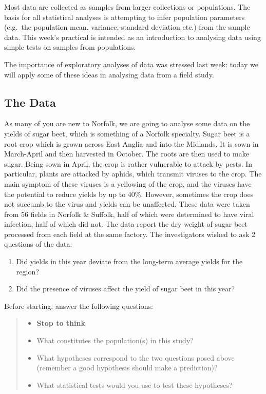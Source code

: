 \documentclass[
]{book}
\providecommand{\tightlist}{%
  \setlength{\itemsep}{0pt}\setlength{\parskip}{0pt}}
\begin{document}
Most data are collected as samples from larger collections or populations. The basis for all statistical analyses is attempting to infer population parameters (e.g.~the population mean, variance, standard deviation etc.) from the sample data. This week's practical is intended as an introduction to analysing data using simple tests on samples from populations.

The importance of exploratory analyses of data was stressed last week: today we will apply some of these ideas in analysing data from a field study.

\subsection{The Data}\label{the-data}

As many of you are new to Norfolk, we are going to analyse some data on the yields of sugar beet, which is something of a Norfolk specialty. Sugar beet is a root crop which is grown across East Anglia and into the Midlands. It is sown in March-April and then harvested in October. The roots are then used to make sugar. Being sown in April, the crop is rather vulnerable to attack by pests. In particular, plants are attacked by aphids, which transmit viruses to the crop. The main symptom of these viruses is a yellowing of the crop, and the viruses have the potential to reduce yields by up to 40\%. However, sometimes the crop does not succumb to the virus and yields can be unaffected.
These data were taken from 56 fields in Norfolk \& Suffolk, half of which were determined to have viral infection, half of which did not. The data report the dry weight of sugar beet processed from each field at the same factory. The investigators wished to ask 2 questions of the data:

\begin{enumerate}
\def\labelenumi{\arabic{enumi})}
\tightlist
\item
  Did yields in this year deviate from the long-term average yields for the region?
\item
  Did the presence of viruses affect the yield of sugar beet in this year?
\end{enumerate}

Before starting, answer the following questions:

\begin{quote}
\begin{itemize}
\tightlist
\item
  \textbf{Stop to think}
\item
  What constitutes the population(s) in this study?
\item
  What hypotheses correspond to the two questions posed above (remember a good hypothesis should make a prediction)?
\item
  What statistical tests would you use to test these hypotheses?
\end{itemize}
\end{quote}
\end{document}

